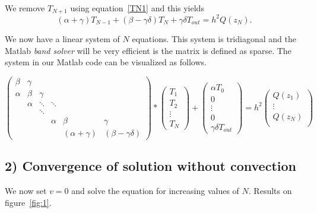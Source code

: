 \documentclass[11pt,a4paper]{report}
\begin{document}
We remove $T_{N+1}$ using equation~\ref{TN1} and this yields
$$(\alpha+\gamma) T_{N-1} + (\beta-\gamma \delta) T_{N} + \gamma \delta T_{out} = h^{2}Q(z_{N}).$$


We now have a linear system of $N$ equations.  This system is tridiagonal and the Matlab \textit{band solver} will be very efficient is the matrix is defined as sparse. The system in our Matlab code can be visualized as follows.

$$
\begin{pmatrix}
\beta  & \gamma &        &         &  & \\
\alpha & \beta  & \gamma &         &  & \\
       & \alpha & \ddots & \ddots  &  & \\
       &        & \ddots &         &   &    \\
	   &        &        & \alpha   & \beta   & \gamma \\
	   &			&		&		  & (\alpha+\gamma)  & (\beta-\gamma \delta)
\end{pmatrix}*
\begin{pmatrix}
T_{1}\\
T_{2}\\
\vdots\\
T_{N}
\end{pmatrix}
+\begin{pmatrix}
\alpha T_{0}\\
0\\
\vdots\\
0\\
\gamma \delta T_{out}
\end{pmatrix} =h^{2}
\begin{pmatrix}
Q(z_{1})\\
\vdots\\
Q(z_{N})\\
\end{pmatrix}
$$

\subsection*{2) Convergence of solution without convection}

We now set $v=0$ and solve the equation for increasing values of $N$. Results on figure~\ref{fig:1}.
\end{document}
